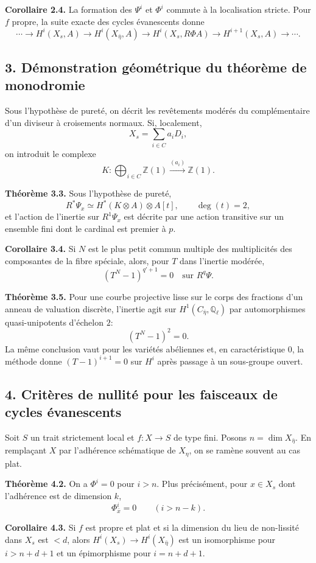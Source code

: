 \documentclass[11pt]{article}
\providecommand{\Z}{\mathbb Z}
\providecommand{\Ql}{\mathbb Q_\ell}
\begin{document}
\textbf{Corollaire 2.4.} La formation des $\Psi^i$ et $\Phi^i$ commute à la localisation stricte. Pour $f$ propre, la suite exacte des cycles évanescents donne
\[
\cdots\to H^i(X_s,A)\to H^i(X_{\bar\eta},A)\to H^i(X_s,R\Phi A)\to H^{i+1}(X_s,A)\to\cdots.
\]

\subsection*{3. Démonstration géométrique du théorème de monodromie}
Sous l'hypothèse de pureté, on décrit les revêtements modérés du complémentaire d'un diviseur à croisements normaux. Si, localement,
\[
X_s=\sum_{i\in C}a_iD_i,
\]
on introduit le complexe
\[
K: \bigoplus_{i\in C}\Z(1)\xrightarrow{(a_i)}\Z(1).
\]

\textbf{Théorème 3.3.} Sous l'hypothèse de pureté,
\[
R^*\Psi_x\simeq H^*(K\otimes A)\otimes A[t],\qquad \deg(t)=2,
\]
et l'action de l'inertie sur $R^1\Psi_x$ est décrite par une action transitive sur un ensemble fini dont le cardinal est premier à $p$.

\textbf{Corollaire 3.4.} Si $N$ est le plus petit commun multiple des multiplicités des composantes de la fibre spéciale, alors, pour $T$ dans l'inertie modérée,
\[
(T^N-1)^{q'+1}=0\quad\text{sur }R^q\Psi.
\]

\textbf{Théorème 3.5.} Pour une courbe projective lisse sur le corps des fractions d'un anneau de valuation discrète, l'inertie agit sur $H^1(C_{\bar\eta},\Ql)$ par automorphismes quasi-unipotents d'échelon $2$:
\[
(T^N-1)^2=0.
\]
La même conclusion vaut pour les variétés abéliennes et, en caractéristique $0$, la méthode donne $(T-1)^{i+1}=0$ sur $H^i$ après passage à un sous-groupe ouvert.

\subsection*{4. Critères de nullité pour les faisceaux de cycles évanescents}
Soit $S$ un trait strictement local et $f:X\to S$ de type fini. Posons $n=\dim X_{\bar\eta}$. En remplaçant $X$ par l'adhérence schématique de $X_\eta$, on se ramène souvent au cas plat.

\textbf{Théorème 4.2.} On a $\Phi^i=0$ pour $i>n$. Plus précisément, pour $x\in X_s$ dont l'adhérence est de dimension $k$,
\[
\Phi^i_{\bar x}=0\qquad (i>n-k).
\]

\textbf{Corollaire 4.3.} Si $f$ est propre et plat et si la dimension du lieu de non-lissité dans $X_s$ est $<d$, alors $H^i(X_s)\to H^i(X_{\bar\eta})$ est un isomorphisme pour $i>n+d+1$ et un épimorphisme pour $i=n+d+1$.
\end{document}

